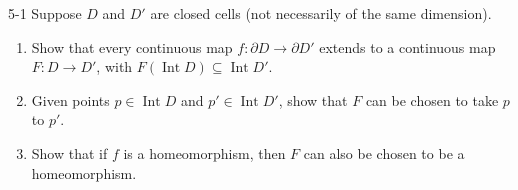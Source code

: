 \begin{problem}{5-1}\label{problem:5-1}
Suppose $D$ and $D'$ are closed cells (not necessarily of the same dimension).
\begin{enumerate}[label={(\alph*)}]
	\item Show that every continuous map $f: \partial D \to \partial D'$ extends to a continuous map $F: D \to D'$, with $F(\operatorname{Int} D) \subseteq \operatorname{Int} D'$.
	\item Given points $p \in \operatorname{Int} D$ and $p' \in \operatorname{Int} D'$, show that $F$ can be chosen to take $p$ to $p'$.
	\item Show that if $f$ is a homeomorphism, then $F$ can also be chosen to be a homeomorphism.
\end{enumerate}
\end{problem}

